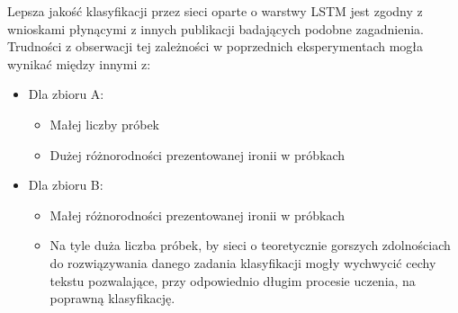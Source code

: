 Lepsza jakość klasyfikacji przez sieci oparte o warstwy LSTM jest zgodny z wnioskami płynącymi z innych publikacji badających podobne zagadnienia. Trudności z obserwacji tej zależności w poprzednich eksperymentach mogła wynikać między innymi z:


\begin{itemize}

    \item Dla zbioru A:
          \begin{itemize}
              \item Małej liczby próbek
              \item Dużej różnorodności prezentowanej ironii w próbkach
          \end{itemize}

    \item Dla zbioru B:
          \begin{itemize}
              \item Małej różnorodności prezentowanej ironii w próbkach
              \item Na tyle duża liczba próbek, by sieci o teoretycznie gorszych zdolnościach do rozwiązywania danego zadania klasyfikacji mogły wychwycić cechy tekstu pozwalające, przy odpowiednio długim procesie uczenia, na poprawną klasyfikację.
          \end{itemize}

\end{itemize}






